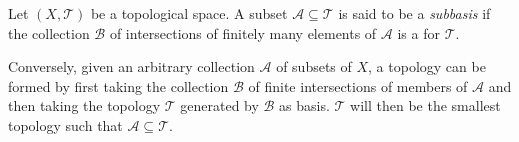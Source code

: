 \documentclass[12pt]{article}
\begin{document}
Let $(X,\mathcal{T})$ be a topological space.  A subset $\mathcal{A}\subseteq\mathcal{T}$ is said to be a \emph{subbasis} if the collection $\mathcal{B}$ of intersections of finitely many elements of $\mathcal{A}$ is a  for $\mathcal{T}$.

Conversely, given an arbitrary collection $\mathcal{A}$ of subsets of $X$, a topology can be formed by first taking the collection $\mathcal{B}$ of finite intersections of members of $\mathcal{A}$ and then taking the topology $\mathcal{T}$ generated by $\mathcal{B}$ as basis.  $\mathcal{T}$ will then be the smallest topology such that $\mathcal{A}\subseteq\mathcal{T}$.
\end{document}
